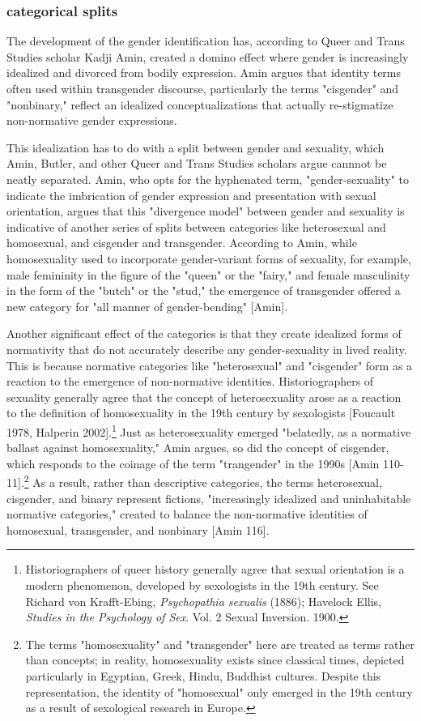 \documentclass[11pt]{article}
\begin{document}
\subsubsection{categorical splits}
\label{sec:orgf7626f3}
The development of the gender identification has, according to Queer
and Trans Studies scholar Kadji Amin, created a domino effect where
gender is increasingly idealized and divorced from bodily expression.
Amin argues that identity terms often used within transgender
discourse, particularly the terms "cisgender" and "nonbinary," reflect
an idealized conceptualizations that actually re-stigmatize
non-normative gender expressions.

This idealization has to do with a split between gender and sexuality,
which Amin, Butler, and other Queer and Trans Studies scholars argue
cannnot be neatly separated. Amin, who opts for the hyphenated term,
"gender-sexuality" to indicate the imbrication of gender expression
and presentation with sexual orientation, argues that this "divergence
model" between gender and sexuality is indicative of another series of
splits between categories like heterosexual and homosexual, and
cisgender and transgender. According to Amin, while homosexuality used
to incorporate gender-variant forms of sexuality, for example, male
femininity in the figure of the "queen" or the "fairy," and female
masculinity in the form of the "butch" or the "stud," the emergence of
transgender offered a new category for "all manner of gender-bending"
[Amin].

Another significant effect of the categories is that they create
idealized forms of normativity that do not accurately describe any
gender-sexuality in lived reality. This is because normative
categories like "heterosexual" and "cisgender" form as a reaction to
the emergence of non-normative identities. Historiographers of
sexuality generally agree that the concept of heterosexuality arose as
a reaction to the definition of homosexuality in the 19th century by
sexologists [Foucault 1978, Halperin 2002].\footnote{Historiographers of queer history generally agree that sexual
orientation is a modern phenomenon, developed by sexologists in the
19th century. See Richard von Krafft-Ebing, \emph{Psychopathia sexualis}
(1886); Havelock Ellis, \emph{Studies in the Psychology of Sex}. Vol. 2
Sexual Inversion. 1900.} Just as
heterosexuality emerged "belatedly, as a normative ballast against
homosexuality," Amin argues, so did the concept of cisgender, which
responds to the coinage of the term "trangender" in the 1990s [Amin
110-11].\footnote{The terms "homosexuality" and "transgender" here are treated as
terms rather than concepts; in reality, homosexuality exists since
classical times, depicted particularly in Egyptian, Greek, Hindu,
Buddhist cultures. Despite this representation, the identity of
"homosexual" only emerged in the 19th century as a result of
sexological research in Europe.} As a result, rather than descriptive categories, the
terms heterosexual, cisgender, and binary represent fictions,
"increasingly idealized and uninhabitable normative categories,"
created to balance the non-normative identities of homosexual,
transgender, and nonbinary [Amin 116].
\end{document}
